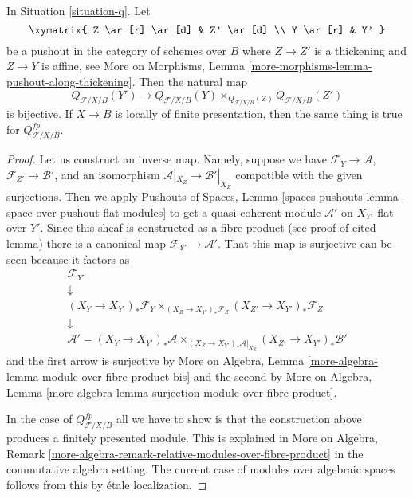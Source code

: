 \begin{lemma}
\label{lemma-q-RS-star}
In Situation \ref{situation-q}. Let
$$
\xymatrix{
Z \ar[r] \ar[d] & Z' \ar[d] \\
Y \ar[r] & Y'
}
$$
be a pushout in the category of schemes over $B$ where
$Z \to Z'$ is a thickening and $Z \to Y$ is affine, see
More on Morphisms, Lemma \ref{more-morphisms-lemma-pushout-along-thickening}.
Then the natural map
$$
Q_{\mathcal{F}/X/B}(Y') \longrightarrow
Q_{\mathcal{F}/X/B}(Y) \times_{Q_{\mathcal{F}/X/B}(Z)} Q_{\mathcal{F}/X/B}(Z')
$$
is bijective. If $X \to B$ is locally of finite presentation, then
the same thing is true for $Q^{fp}_{\mathcal{F}/X/B}$.
\end{lemma}

\begin{proof}
Let us construct an inverse map. Namely, suppose we have
$\mathcal{F}_Y \to \mathcal{A}$,
$\mathcal{F}_{Z'} \to \mathcal{B}'$, and an isomorphism
$\mathcal{A}|_{X_Z} \to \mathcal{B}'|_{X_Z}$
compatible with the given surjections.
Then we apply Pushouts of Spaces, Lemma
\ref{spaces-pushouts-lemma-space-over-pushout-flat-modules}
to get a quasi-coherent module $\mathcal{A}'$ on $X_{Y'}$
flat over $Y'$. Since this sheaf is constructed as a fibre product
(see proof of cited lemma) there is a canonical map
$\mathcal{F}_{Y'} \to \mathcal{A}'$. That this map is surjective
can be seen because it factors as
$$
\begin{matrix}
\mathcal{F}_{Y'} \\
\downarrow \\
(X_Y \to X_{Y'})_*\mathcal{F}_Y
\times_{(X_Z \to X_{Y'})_*\mathcal{F}_Z}
(X_{Z'} \to X_{Y'})_*\mathcal{F}_{Z'} \\
\downarrow \\
\mathcal{A}' =
(X_Y \to X_{Y'})_*\mathcal{A}
\times_{(X_Z \to X_{Y'})_*\mathcal{A}|_{X_Z}}
(X_{Z'} \to X_{Y'})_*\mathcal{B}'
\end{matrix}
$$
and the first arrow is surjective by
More on Algebra, Lemma \ref{more-algebra-lemma-module-over-fibre-product-bis}
and the second by
More on Algebra, Lemma
\ref{more-algebra-lemma-surjection-module-over-fibre-product}.

\medskip\noindent
In the case of $Q^{fp}_{\mathcal{F}/X/B}$ all we have to show is that
the construction above produces a finitely presented module.
This is explained in
More on Algebra, Remark
\ref{more-algebra-remark-relative-modules-over-fibre-product}
in the commutative algebra setting. The current case of modules
over algebraic spaces follows from this
by \'etale localization.
\end{proof}

